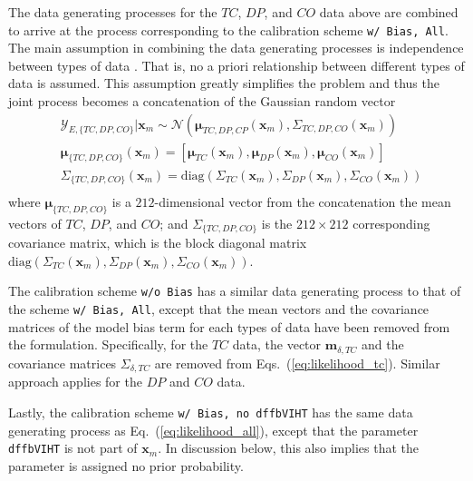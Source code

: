 The data generating processes for the $TC$, $DP$, and $CO$ data above are combined to arrive at the process corresponding to the calibration scheme \texttt{w/ Bias, All}.
The main assumption in combining the data generating processes is independence between types of data \cite{Reichert2012}.
That is, no a priori relationship between different types of data is assumed.
This assumption greatly simplifies the problem and thus the joint process becomes a concatenation of the Gaussian random vector
\begin{equation}
	\begin{split}
		& \bm{\mathcal{Y}}_{E,\{TC,DP,CO\}} | \bm{x}_m \sim \mathcal{N} (\boldsymbol{\mu}_{TC,DP,CP} (\bm{x}_m), \Sigma_{TC,DP,CO} (\bm{x}_m)) \\
		& \boldsymbol{\mu}_{\{TC,DP,CO\}} (\bm{x}_m) = \left[ \boldsymbol{\mu}_{TC} (\bm{x}_m), \boldsymbol{\mu}_{DP} (\bm{x}_m), \boldsymbol{\mu}_{CO} (\bm{x}_m) \right ] \\
		& \Sigma_{\{TC,DP,CO\}} (\bm{x}_m) = \text{diag}(\Sigma_{TC} (\bm{x}_m), \Sigma_{DP} (\bm{x}_m), \Sigma_{CO} (\bm{x}_m)) \\
	\end{split}
\label{eq:likelihood_all}
\end{equation}
where $\boldsymbol{\mu}_{\{TC,DP,CO\}}$ is a $212$-dimensional vector from the concatenation the mean vectors of $TC$, $DP$, and $CO$;
and $\Sigma_{\{TC,DP,CO\}}$ is the $212 \times 212$ corresponding covariance matrix, which is the block diagonal matrix $\text{diag}(\Sigma_{TC} (\bm{x}_m), \Sigma_{DP} (\bm{x}_m), \Sigma_{CO} (\bm{x}_m))$.

The calibration scheme \texttt{w/o Bias} has a similar data generating process to that of the scheme \texttt{w/ Bias, All},
except that the mean vectors and the covariance matrices of the model bias term for each types of data have been removed from the formulation.
Specifically, for the $TC$ data, the vector $\mathbf{m}_{\delta,TC}$ and the covariance matrices $\Sigma_{\delta,TC}$ are removed from Eqs.~(\ref{eq:likelihood_tc}).
Similar approach applies for the $DP$ and $CO$ data.

Lastly, the calibration scheme \texttt{w/ Bias, no dffbVIHT} has the same data generating process as Eq.~(\ref{eq:likelihood_all}), except that the parameter \texttt{dffbVIHT} is not part of $\bm{x}_m$.
In discussion below, this also implies that the parameter is assigned no prior probability.

